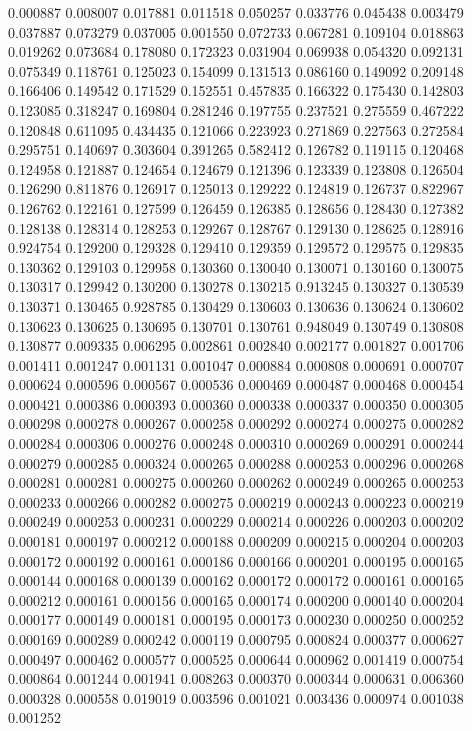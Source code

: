 0.000887
0.008007
0.017881
0.011518
0.050257
0.033776
0.045438
0.003479
0.037887
0.073279
0.037005
0.001550
0.072733
0.067281
0.109104
0.018863
0.019262
0.073684
0.178080
0.172323
0.031904
0.069938
0.054320
0.092131
0.075349
0.118761
0.125023
0.154099
0.131513
0.086160
0.149092
0.209148
0.166406
0.149542
0.171529
0.152551
0.457835
0.166322
0.175430
0.142803
0.123085
0.318247
0.169804
0.281246
0.197755
0.237521
0.275559
0.467222
0.120848
0.611095
0.434435
0.121066
0.223923
0.271869
0.227563
0.272584
0.295751
0.140697
0.303604
0.391265
0.582412
0.126782
0.119115
0.120468
0.124958
0.121887
0.124654
0.124679
0.121396
0.123339
0.123808
0.126504
0.126290
0.811876
0.126917
0.125013
0.129222
0.124819
0.126737
0.822967
0.126762
0.122161
0.127599
0.126459
0.126385
0.128656
0.128430
0.127382
0.128138
0.128314
0.128253
0.129267
0.128767
0.129130
0.128625
0.128916
0.924754
0.129200
0.129328
0.129410
0.129359
0.129572
0.129575
0.129835
0.130362
0.129103
0.129958
0.130360
0.130040
0.130071
0.130160
0.130075
0.130317
0.129942
0.130200
0.130278
0.130215
0.913245
0.130327
0.130539
0.130371
0.130465
0.928785
0.130429
0.130603
0.130636
0.130624
0.130602
0.130623
0.130625
0.130695
0.130701
0.130761
0.948049
0.130749
0.130808
0.130877
0.009335
0.006295
0.002861
0.002840
0.002177
0.001827
0.001706
0.001411
0.001247
0.001131
0.001047
0.000884
0.000808
0.000691
0.000707
0.000624
0.000596
0.000567
0.000536
0.000469
0.000487
0.000468
0.000454
0.000421
0.000386
0.000393
0.000360
0.000338
0.000337
0.000350
0.000305
0.000298
0.000278
0.000267
0.000258
0.000292
0.000274
0.000275
0.000282
0.000284
0.000306
0.000276
0.000248
0.000310
0.000269
0.000291
0.000244
0.000279
0.000285
0.000324
0.000265
0.000288
0.000253
0.000296
0.000268
0.000281
0.000281
0.000275
0.000260
0.000262
0.000249
0.000265
0.000253
0.000233
0.000266
0.000282
0.000275
0.000219
0.000243
0.000223
0.000219
0.000249
0.000253
0.000231
0.000229
0.000214
0.000226
0.000203
0.000202
0.000181
0.000197
0.000212
0.000188
0.000209
0.000215
0.000204
0.000203
0.000172
0.000192
0.000161
0.000186
0.000166
0.000201
0.000195
0.000165
0.000144
0.000168
0.000139
0.000162
0.000172
0.000172
0.000161
0.000165
0.000212
0.000161
0.000156
0.000165
0.000174
0.000200
0.000140
0.000204
0.000177
0.000149
0.000181
0.000195
0.000173
0.000230
0.000250
0.000252
0.000169
0.000289
0.000242
0.000119
0.000795
0.000824
0.000377
0.000627
0.000497
0.000462
0.000577
0.000525
0.000644
0.000962
0.001419
0.000754
0.000864
0.001244
0.001941
0.008263
0.000370
0.000344
0.000631
0.006360
0.000328
0.000558
0.019019
0.003596
0.001021
0.003436
0.000974
0.001038
0.001252
